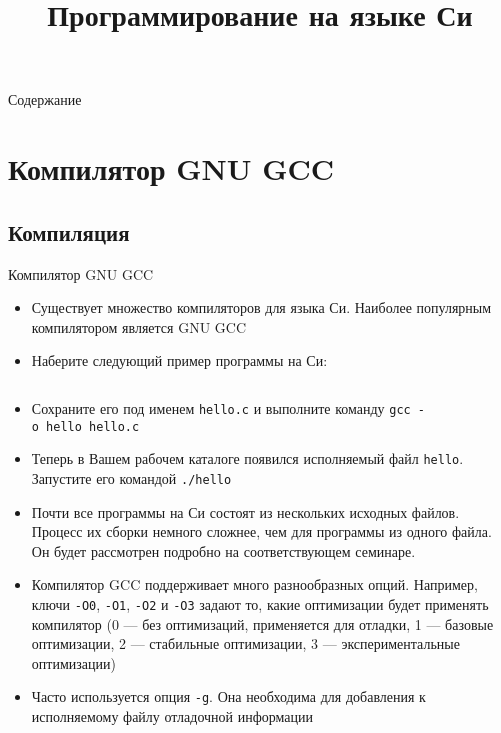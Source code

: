 \documentclass[handout]{beamer}
\title{Программирование на языке Си}
\date{}
\begin{document}
	
\begin{frame}
	\maketitle
\end{frame}
	
\begin{frame}[allowframebreaks]{Содержание}
	\tableofcontents
\end{frame}
	
\section{Компилятор GNU GCC}

\subsection{Компиляция}
\begin{frame}{Компилятор GNU GCC}
	\begin{itemize}
		\item{Существует множество компиляторов для языка Си. Наиболее популярным компилятором является GNU GCC}\pause
		\item{Наберите следующий пример программы на Си:}
	\end{itemize}
	\vspace*{-\baselineskip}
	\inputminted[linenos,bgcolor=listing]{C}{files/c_programming_langauge/hello.c}\pause
	\vspace*{-\baselineskip}
	\begin{itemize}
		\item{Сохраните его под именем \texttt{hello.c} и выполните команду \texttt{gcc~-o~hello~hello.c}}
	\end{itemize}
\end{frame}

\begin{frame}
	\begin{itemize}
		\item{Теперь в Вашем рабочем каталоге появился исполняемый файл \texttt{hello}. Запустите его командой \texttt{./hello}}\pause
		\item{Почти все программы на Си состоят из нескольких исходных файлов. Процесс их сборки немного сложнее, чем для программы из одного файла. Он будет рассмотрен подробно на соответствующем семинаре.}\pause
		\item{Компилятор GCC поддерживает много разнообразных опций. Например, ключи \texttt{-O0}, \texttt{-O1}, \texttt{-O2} и \texttt{-O3} задают то, какие оптимизации будет применять компилятор (0 --- без оптимизаций, применяется для отладки, 1 --- базовые оптимизации, 2 --- стабильные оптимизации, 3 --- экспериментальные оптимизации)}\pause
		\item{Часто используется опция \texttt{-g}. Она необходима для добавления к исполняемому файлу отладочной информации}
	\end{itemize}
\end{frame}
\end{document}
